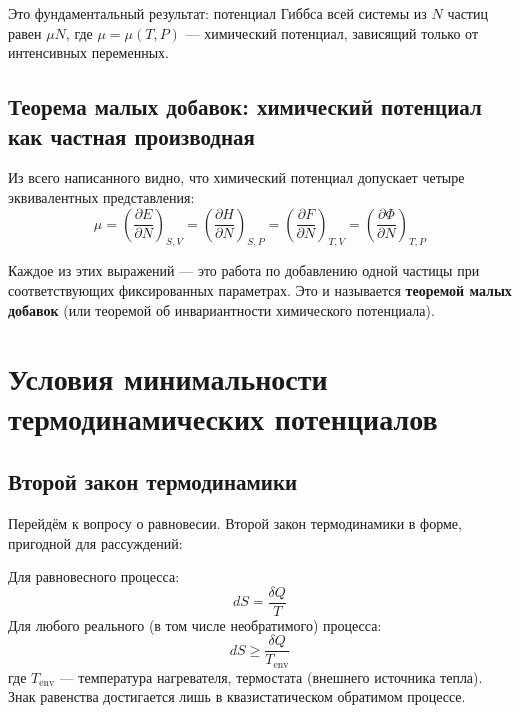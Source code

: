 \documentclass[../general/general]{subfiles}
\begin{document}
Это фундаментальный результат: потенциал Гиббса всей системы из $N$ частиц равен $\mu N$, где $\mu = \mu(T, P)$ --- химический потенциал, зависящий только от интенсивных переменных.

\subsection{Теорема малых добавок: химический потенциал как частная производная}

Из всего написанного видно, что химический потенциал допускает четыре эквивалентных представления:
\begin{equation}
    \boxed{\mu = \left(\frac{\partial E}{\partial N}\right)_{S,V} = \left(\frac{\partial H}{\partial N}\right)_{S,P} = \left(\frac{\partial F}{\partial N}\right)_{T,V} = \left(\frac{\partial \Phi}{\partial N}\right)_{T,P}}
    \label{eq:mu_four}
\end{equation}

Каждое из этих выражений --- это работа по добавлению одной частицы при соответствующих фиксированных параметрах. Это и называется \textbf{теоремой малых добавок} (или теоремой об инвариантности химического потенциала).



\section{Условия минимальности термодинамических потенциалов}

\subsection{Второй закон термодинамики}

Перейдём к вопросу о равновесии. Второй закон термодинамики в форме, пригодной для рассуждений:

Для равновесного процесса:
\begin{equation}
    dS = \frac{\delta Q}{T}
\end{equation}
Для любого реального (в том числе необратимого) процесса:
\begin{equation}
    dS \geq \frac{\delta Q}{T_\text{env}}
\end{equation}
где $T_\text{env}$ --- температура нагревателя, термостата (внешнего источника тепла). Знак равенства достигается лишь в квазистатическом обратимом процессе.
\end{document}

